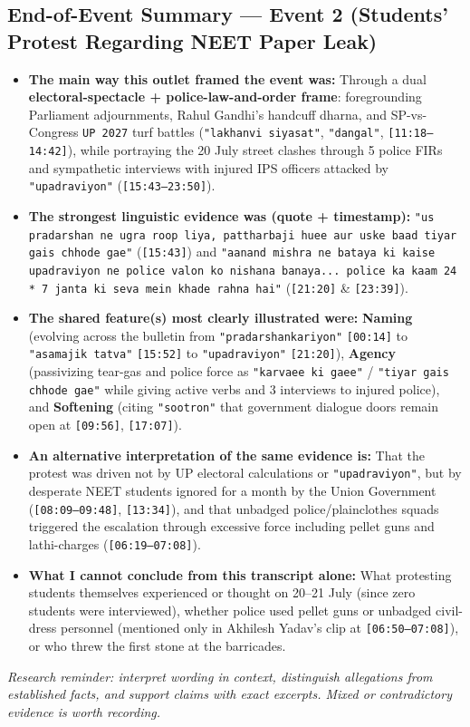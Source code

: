 \documentclass[10pt,a4paper]{article}
\begin{document}
\subsection*{End-of-Event Summary --- Event 2 (Students' Protest Regarding NEET Paper Leak)}
\begin{itemize}[leftmargin=1.5em, itemsep=3pt, topsep=4pt]
  \item \textbf{The main way this outlet framed the event was:} Through a dual \textbf{electoral-spectacle + police-law-and-order frame}: foregrounding Parliament adjournments, Rahul Gandhi's handcuff dharna, and SP-vs-Congress \texttt{UP 2027} turf battles (\texttt{"lakhanvi siyasat"}, \texttt{"dangal"}, \texttt{[11:18--14:42]}), while portraying the 20 July street clashes through 5 police FIRs and sympathetic interviews with injured IPS officers attacked by \texttt{"upadraviyon"} (\texttt{[15:43--23:50]}).
  \item \textbf{The strongest linguistic evidence was (quote + timestamp):} \texttt{"us pradarshan ne ugra roop liya, pattharbaji huee aur uske baad tiyar gais chhode gae"} (\texttt{[15:43]}) and \texttt{"aanand mishra ne bataya ki kaise upadraviyon ne police valon ko nishana banaya... police ka kaam 24 * 7 janta ki seva mein khade rahna hai"} (\texttt{[21:20]} \& \texttt{[23:39]}).
  \item \textbf{The shared feature(s) most clearly illustrated were:} \textbf{Naming} (evolving across the bulletin from \texttt{"pradarshankariyon"} \texttt{[00:14]} to \texttt{"asamajik tatva"} \texttt{[15:52]} to \texttt{"upadraviyon"} \texttt{[21:20]}), \textbf{Agency} (passivizing tear-gas and police force as \texttt{"karvaee ki gaee"} / \texttt{"tiyar gais chhode gae"} while giving active verbs and 3 interviews to injured police), and \textbf{Softening} (citing \texttt{"sootron"} that government dialogue doors remain open at \texttt{[09:56]}, \texttt{[17:07]}).
  \item \textbf{An alternative interpretation of the same evidence is:} That the protest was driven not by UP electoral calculations or \texttt{"upadraviyon"}, but by desperate NEET students ignored for a month by the Union Government (\texttt{[08:09--09:48]}, \texttt{[13:34]}), and that unbadged police/plainclothes squads triggered the escalation through excessive force including pellet guns and lathi-charges (\texttt{[06:19--07:08]}).
  \item \textbf{What I cannot conclude from this transcript alone:} What protesting students themselves experienced or thought on 20--21 July (since zero students were interviewed), whether police used pellet guns or unbadged civil-dress personnel (mentioned only in Akhilesh Yadav's clip at \texttt{[06:50--07:08]}), or who threw the first stone at the barricades.
\end{itemize}
\textit{Research reminder: interpret wording in context, distinguish allegations from established facts, and support claims with exact excerpts. Mixed or contradictory evidence is worth recording.}
\end{document}
